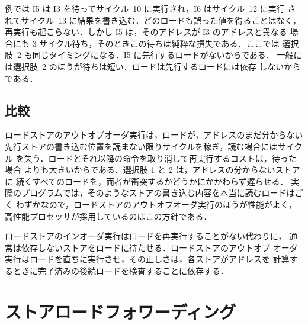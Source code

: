 \documentclass[../main.tex]{subfiles}
\begin{document}
例では I5 は I3 を待ってサイクル~10 に実行され，I6 はサイクル~12 に実行
されてサイクル~13 に結果を書き込む．どのロードも誤った値を得ることはなく，
再実行も起こらない．しかし I5 は，そのアドレスが I3 のアドレスと異なる
場合にも 3 サイクル待ち，そのときこの待ちは純粋な損失である．ここでは
選択肢~2 も同じタイミングになる．I5 に先行するロードがないからである．
一般には選択肢~2 のほうが待ちは短い．ロードは先行するロードには依存
しないからである．

\subsection{比較}

ロードストアのアウトオブオーダ実行は，ロードが，アドレスのまだ分からない
先行ストアの書き込む位置を読まない限りサイクルを稼ぎ，読む場合にはサイクル
を失う．ロードとそれ以降の命令を取り消して再実行するコストは，待った場合
よりも大きいからである．選択肢 1 と 2 は，アドレスの分からないストアに
続くすべてのロードを，両者が衝突するかどうかにかかわらず遅らせる．
実際のプログラムでは，そのようなストアの書き込む内容を本当に読むロードはごく
わずかなので，ロードストアのアウトオブオーダ実行のほうが性能がよく，
高性能プロセッサが採用しているのはこの方針である．

\begin{keypoint}
  ロードストアのインオーダ実行はロードを再実行することがない代わりに，
  通常は依存しないストアをロードに待たせる．ロードストアのアウトオブ
  オーダ実行はロードを直ちに実行させ，その正しさは，各ストアがアドレスを
  計算するときに完了済みの後続ロードを検査することに依存する．
\end{keypoint}

\section{ストアロードフォワーディング}
\label{sec:l09-forwarding}
\end{document}

